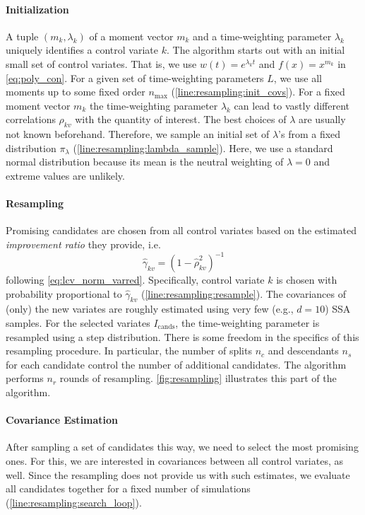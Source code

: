 \paragraph{Initialization} A tuple $({m}_k, \lambda_k)$ of a moment vector ${m}_k$ and a time-weighting parameter $\lambda_k$
uniquely identifies a control variate $k$.
The algorithm starts out with an initial small set of control variates.
That is, we use $w(t)=e^{\lambda_kt}$ and $f(x)=x^{m_k}$ in \eqref{eq:poly_con}.
For a given set of time-weighting parameters $L$, we use all moments up to some fixed order $n_{\max}$ (\autoref{line:resampling:init_covs}).
For a fixed moment vector $m_k$ the time-weighting parameter $\lambda_k$ can lead to vastly different correlations $\rho_{kv}$ with the quantity of interest.
The best choices of $\lambda$ are usually not known beforehand.
Therefore, we sample an initial set of $\lambda$'s
from a fixed distribution $\pi_{\lambda}$ (\autoref{line:resampling:lambda_sample}).
Here, we use a standard normal distribution because its mean is the neutral weighting of $\lambda=0$ and extreme values are unlikely.

\paragraph{Resampling} Promising candidates are chosen from all control variates based on the estimated \emph{improvement ratio} they
provide, i.e.\ 
\begin{equation}
\hat{\gamma}_{kv} = ({1 - \hat{\rho}_{kv}^2})^{-1}
\end{equation}
following \eqref{eq:lcv_norm_varred}.
Specifically, control variate $k$ is chosen with probability proportional to
${\hat{\gamma}}_{kv}$ (\autoref{line:resampling:resample}).
The covariances of (only) the new variates are roughly estimated using very few (e.g., $d= 10$) \ac{SSA} samples. 
For the selected variates $I_{\text{cands}}$, the time-weighting parameter is resampled using a step distribution.
There is some freedom in the specifics of this resampling procedure.
In particular, the number of splits $n_c$ and descendants $n_s$ for each candidate control the number of additional candidates.
The algorithm performs $n_r$ rounds of resampling.
\autoref{fig:resampling} illustrates this part of the algorithm.

\paragraph{Covariance Estimation} After sampling a set of candidates this way, we need to select the most promising ones.
For this, we are interested in covariances between all control variates, as well.
Since the resampling does not provide us with such estimates, we evaluate all candidates together for a fixed number of simulations (\autoref{line:resampling:search_loop}).

